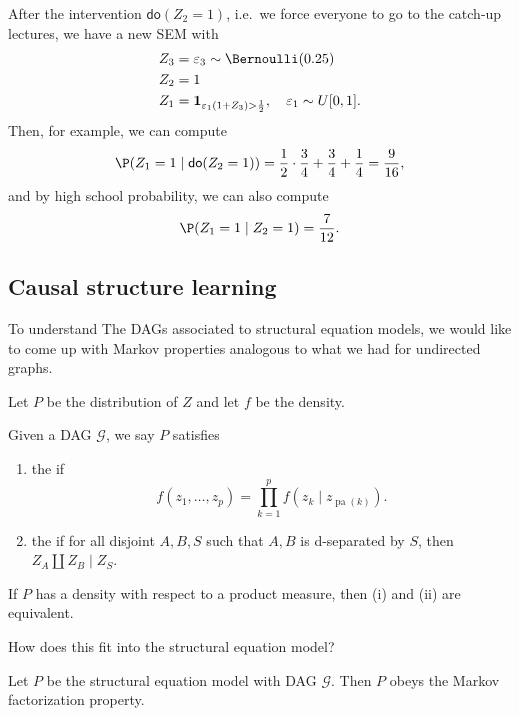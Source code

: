 \documentclass[a4paper]{article}
\DeclareMathOperator\pa{pa}
\newcommand\ddo{\mathsf{do}}
\begin{document}
\begin{eg}
  After the intervention $\ddo(Z_2 = 1)$, i.e.\ we force everyone to go to the catch-up lectures, we have a new SEM with
  \begin{align*}
    Z_3 &= \varepsilon_3 \sim \Bernoulli(0.25)\\
    Z_2 &= 1\\
    Z_1 &= \mathbf{1}_{\varepsilon_1 (1 + Z_3) > \frac{1}{2}}, \quad \varepsilon_1 \sim U[0, 1].
  \end{align*}
  Then, for example, we can compute
  \[
    \P(Z_1 = 1 \mid \ddo(Z_2 = 1)) = \frac{1}{2} \cdot \frac{3}{4} + \frac{3}{4} + \frac{1}{4} = \frac{9}{16},
  \]
  and by high school probability, we can also compute
  \[
    \P(Z_1 = 1 \mid Z_2 = 1) = \frac{7}{12}.
  \]
\end{eg}

\subsection{Causal structure learning}
To understand The DAGs associated to structural equation models, we would like to come up with Markov properties analogous to what we had for undirected graphs.

Let $P$ be the distribution of $Z$ and let $f$ be the density.
\begin{defi}
  Given a DAG $\mathcal{G}$, we say $P$ satisfies
  \begin{enumerate}
    \item the  if
      \[
        f(z_1, \ldots, z_p) = \prod_{k = 1}^p f(z_k \mid z_{\pa(k)}).
      \]
    \item the  if for all disjoint $A, B, S$ such that $A, B$ is d-separated by $S$, then $Z_A \amalg Z_B \mid Z_S$.
  \end{enumerate}
\end{defi}

\begin{prop}
  If $P$ has a density with respect to a product measure, then (i) and (ii) are equivalent.
\end{prop}

How does this fit into the structural equation model?

\begin{prop}
  Let $P$ be the structural equation model with DAG $\mathcal{G}$. Then $P$ obeys the Markov factorization property.
\end{prop}
\end{document}
